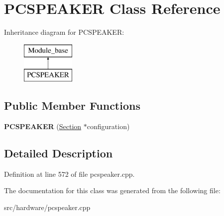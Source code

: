\hypertarget{classPCSPEAKER}{\section{P\-C\-S\-P\-E\-A\-K\-E\-R Class Reference}
\label{classPCSPEAKER}
}
Inheritance diagram for P\-C\-S\-P\-E\-A\-K\-E\-R\-:\begin{figure}[H]
\begin{center}
\leavevmode
\includegraphics[height=2.000000cm]{classPCSPEAKER}
\end{center}
\end{figure}
\subsection*{Public Member Functions}
\begin{DoxyCompactItemize}
\item 
\hypertarget{classPCSPEAKER_a7c610f8af87ac405537da150878488aa}{{\bfseries P\-C\-S\-P\-E\-A\-K\-E\-R} (\hyperlink{classSection}{Section} $\ast$configuration)}\label{classPCSPEAKER_a7c610f8af87ac405537da150878488aa}

\end{DoxyCompactItemize}


\subsection{Detailed Description}


Definition at line 572 of file pcspeaker.\-cpp.



The documentation for this class was generated from the following file\-:\begin{DoxyCompactItemize}
\item 
src/hardware/pcspeaker.\-cpp\end{DoxyCompactItemize}
